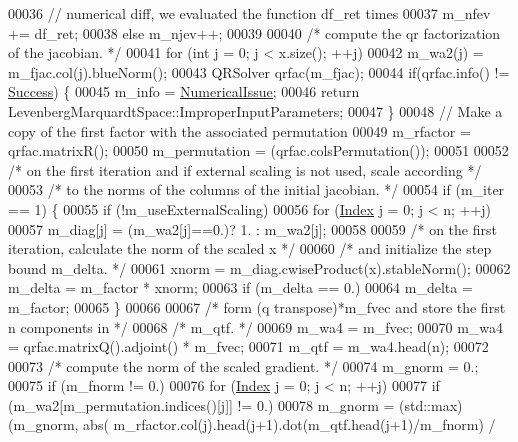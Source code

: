 \begin{DoxyCode}
00036       \textcolor{comment}{// numerical diff, we evaluated the function df\_ret times}
00037       m\_nfev += df\_ret;
00038   \textcolor{keywordflow}{else} m\_njev++;
00039 
00040   \textcolor{comment}{/* compute the qr factorization of the jacobian. */}
00041   \textcolor{keywordflow}{for} (\textcolor{keywordtype}{int} j = 0; j < x.size(); ++j)
00042     m\_wa2(j) = m\_fjac.col(j).blueNorm();
00043   QRSolver qrfac(m\_fjac);
00044   \textcolor{keywordflow}{if}(qrfac.info() != \hyperlink{group__enums_gga85fad7b87587764e5cf6b513a9e0ee5ea52581b035f4b59c203b8ff999ef5fcea}{Success}) \{
00045     m\_info = \hyperlink{group__enums_gga85fad7b87587764e5cf6b513a9e0ee5eaaf9b736d310a664e7729d163a035cc5f}{NumericalIssue};
00046     \textcolor{keywordflow}{return} LevenbergMarquardtSpace::ImproperInputParameters;
00047   \}
00048   \textcolor{comment}{// Make a copy of the first factor with the associated permutation}
00049   m\_rfactor = qrfac.matrixR();
00050   m\_permutation = (qrfac.colsPermutation());
00051 
00052   \textcolor{comment}{/* on the first iteration and if external scaling is not used, scale according */}
00053   \textcolor{comment}{/* to the norms of the columns of the initial jacobian. */}
00054   \textcolor{keywordflow}{if} (m\_iter == 1) \{
00055       \textcolor{keywordflow}{if} (!m\_useExternalScaling)
00056           \textcolor{keywordflow}{for} (\hyperlink{namespace_eigen_a62e77e0933482dafde8fe197d9a2cfde}{Index} j = 0; j < n; ++j)
00057               m\_diag[j] = (m\_wa2[j]==0.)? 1. : m\_wa2[j];
00058 
00059       \textcolor{comment}{/* on the first iteration, calculate the norm of the scaled x */}
00060       \textcolor{comment}{/* and initialize the step bound m\_delta. */}
00061       xnorm = m\_diag.cwiseProduct(x).stableNorm();
00062       m\_delta = m\_factor * xnorm;
00063       \textcolor{keywordflow}{if} (m\_delta == 0.)
00064           m\_delta = m\_factor;
00065   \}
00066 
00067   \textcolor{comment}{/* form (q transpose)*m\_fvec and store the first n components in */}
00068   \textcolor{comment}{/* m\_qtf. */}
00069   m\_wa4 = m\_fvec;
00070   m\_wa4 = qrfac.matrixQ().adjoint() * m\_fvec; 
00071   m\_qtf = m\_wa4.head(n);
00072 
00073   \textcolor{comment}{/* compute the norm of the scaled gradient. */}
00074   m\_gnorm = 0.;
00075   \textcolor{keywordflow}{if} (m\_fnorm != 0.)
00076       \textcolor{keywordflow}{for} (\hyperlink{namespace_eigen_a62e77e0933482dafde8fe197d9a2cfde}{Index} j = 0; j < n; ++j)
00077           \textcolor{keywordflow}{if} (m\_wa2[m\_permutation.indices()[j]] != 0.)
00078               m\_gnorm = (std::max)(m\_gnorm, abs( m\_rfactor.col(j).head(j+1).dot(m\_qtf.head(j+1)/m\_fnorm) / 

\end{DoxyCode}
